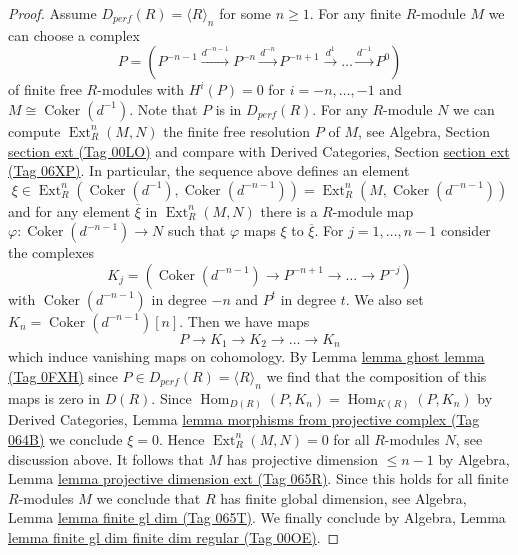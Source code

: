\documentclass{amsart}
\theoremstyle{plain}
\theoremstyle{definition}
\theoremstyle{remark}
\numberwithin{equation}{subsection}
\def\Hom{\mathop{\mathrm{Hom}}\nolimits}
\def\Ext{\mathop{\mathrm{Ext}}\nolimits}
\def\Coker{\mathop{\mathrm{Coker}}}
\begin{document}
\begin{proof}
Assume $D_{perf}(R) = \langle R \rangle_n$ for some $n \geq 1$.
For any finite $R$-module $M$ we can choose a complex
$$
P = (
P^{-n - 1} \xrightarrow{d^{-n - 1}}
P^{-n} \xrightarrow{d^{-n}}
P^{-n + 1} \xrightarrow{d^1}
\ldots \xrightarrow{d^{-1}} P^0)
$$
of finite free $R$-modules with $H^i(P) = 0$ for $i = -n, \ldots, - 1$
and $M \cong \Coker(d^{-1})$. Note that $P$ is in $D_{perf}(R)$.
For any $R$-module $N$ we can compute $\Ext^n_R(M, N)$
the finite free resolution $P$ of $M$, see
Algebra, Section \href{https://stacks.math.columbia.edu/tag/00LO}{section ext (Tag 00LO)} and compare with
Derived Categories, Section \href{https://stacks.math.columbia.edu/tag/06XP}{section ext (Tag 06XP)}.
In particular, the sequence above defines an element
$$
\xi \in \Ext^n_R(\Coker(d^{-1}), \Coker(d^{-n - 1})) =
\Ext^n_R(M, \Coker(d^{-n - 1}))
$$
and for any element $\overline{\xi}$ in $\Ext^n_R(M, N)$
there is a $R$-module map $\varphi : \Coker(d^{-n - 1}) \to N$ such
that $\varphi$ maps $\xi$ to $\overline{\xi}$.
For $j = 1, \ldots, n - 1$ consider the complexes
$$
K_j = (\Coker(d^{-n - 1}) \to P^{-n + 1} \to \ldots \to P^{-j})
$$
with $\Coker(d^{-n - 1})$ in degree $-n$ and $P^t$ in degree $t$.
We also set $K_n = \Coker(d^{-n - 1})[n]$. Then we have maps
$$
P \to K_1 \to K_2 \to \ldots \to K_n
$$
which induce vanishing maps on cohomology. By Lemma \href{https://stacks.math.columbia.edu/tag/0FXH}{lemma ghost lemma (Tag 0FXH)}
since $P \in D_{perf}(R) = \langle R \rangle_n$ we find that the composition
of this maps is zero in $D(R)$. Since
$\Hom_{D(R)}(P, K_n) = \Hom_{K(R)}(P, K_n)$ by
Derived Categories, Lemma \href{https://stacks.math.columbia.edu/tag/064B}{lemma morphisms from projective complex (Tag 064B)}
we conclude $\xi = 0$. Hence $\Ext^n_R(M, N) = 0$ for all $R$-modules
$N$, see discussion above.
It follows that $M$ has projective dimension $\leq n - 1$ by
Algebra, Lemma \href{https://stacks.math.columbia.edu/tag/065R}{lemma projective dimension ext (Tag 065R)}.
Since this holds for all finite $R$-modules $M$ we conclude that
$R$ has finite global dimension, see
Algebra, Lemma \href{https://stacks.math.columbia.edu/tag/065T}{lemma finite gl dim (Tag 065T)}.
We finally conclude by Algebra, Lemma
\href{https://stacks.math.columbia.edu/tag/00OE}{lemma finite gl dim finite dim regular (Tag 00OE)}.
\end{proof}
\end{document}

